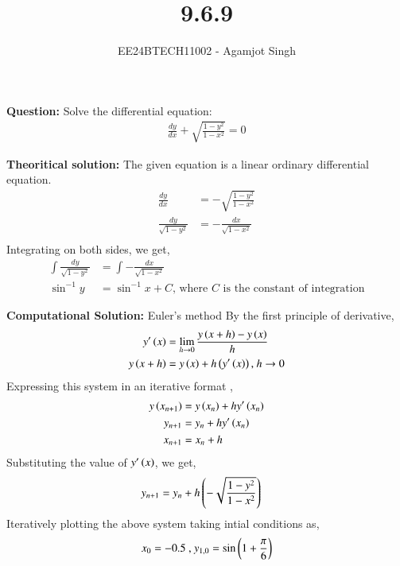\documentclass[journal]{IEEEtran}
\begin{document}

\vspace{3cm}

\title{9.6.9}
\author{EE24BTECH11002 - Agamjot Singh}
{\let\newpage\relax\maketitle}

\renewcommand{\thefigure}{\theenumi}
\renewcommand{\thetable}{\theenumi}
\setlength{\intextsep}{10pt} %

\textbf{Question:}
\newline
Solve the differential equation:
\begin{align}
    \frac{dy}{dx} + \sqrt{\frac{1 - y^2}{1 - x^2}} = 0
\end{align}

\textbf{Theoritical solution:}
The given equation is a linear ordinary differential equation.
\begin{align}
    \frac{dy}{dx} &= -\sqrt{\frac{1 - y^2}{1 - x^2}}\\
    \frac{dy}{\sqrt{1 - y^2}} &= -\frac{dx}{\sqrt{1 - x^2}}\\
\end{align}
Integrating on both sides, we get,
\begin{align}
    \int \frac{dy}{\sqrt{1 - y^2}} &= \int -\frac{dx}{\sqrt{1 - x^2}}\\
    \sin^{-1}{y} &= \sin^{-1}{x} + C \text{, where } C \text{ is the constant of integration}
\end{align}

\textbf{Computational Solution:} Euler's method
\newline
By the first principle of derivative,
\begin{align}
    y^{\prime}\left(x\right) &= \lim_{h\to0} \frac{y\left(x + h\right) - y\left(x\right)}{h}\\
    y\left(x + h\right) &= y\left(x\right) + h\left(y^{\prime}\left(x\right)\right) \text{, } h\to0
\end{align}
Expressing this system in an iterative format ,
\begin{align}
    y\left(x_{n + 1}\right) &= y\left(x_n\right) + hy^{\prime}\left(x_n\right)\\
    y_{n + 1} &= y_n + hy^{\prime}\left(x_n\right)\\
    x_{n + 1} &= x_n + h
\end{align}
Substituting the value of $y^{\prime}\left(x\right)$, we get,
\begin{align}
    y_{n + 1} &= y_n + h\left(-\sqrt{\frac{1 - y^2}{1 - x^2}}\right)
\end{align}
Iteratively plotting the above system taking intial conditions as,
\begin{align}
    x_0 = -0.5 \text{ , } y_{1, 0} = \sin{\ensuremath{\left(1 + \frac{\pi}{6}\right)}}
\end{align}
\end{document}
